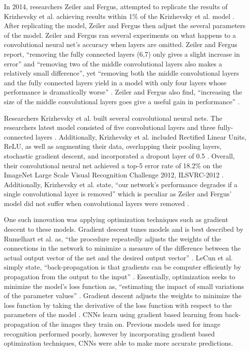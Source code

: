 \documentclass[12pt,english]{article}
\begin{document}
In 2014, researchers Zeiler and Fergus, attempted to replicate the results of Krizhevsky et al. achieving results within 1\% of the Krizhevsky et al. model \citep{DBLP:journals/corr/ZeilerF13}. After replicating the model, Zeiler and Fergus then adjust the several parameters of the model. Zeiler and Fergus ran several experiments on what happens to a convolutional neural net’s accuracy when layers are omitted. Zeiler and Fergus report, ``removing the fully connected layers (6,7) only gives a slight increase in error'' and ``removing two of the middle convolutional layers also makes a relatively small difference'', yet ``removing both the middle convolutional layers and the fully connected layers yield in a model with only four layers whose performance is dramatically worse'' \citep{DBLP:journals/corr/ZeilerF13}. Zeiler and Fergus also find, ``increasing the size of the middle convolutional layers goes give a useful gain in performance'' \citep{DBLP:journals/corr/ZeilerF13}.\par

Researchers Krizhevsky et al. built several convolutional neural nets. The researchers latest model consisted of five convolutional layers and three fully-connected layers \citep{NIPS2012_4824}. Additionally, Krizhevsky et al. included Rectified Linear Units, ReLU, as well as augmenting their data, overlapping their pooling layers, stochastic gradient descent, and incorporated a dropout layer of 0.5 \citep{NIPS2012_4824}. Overall, their convolutional neural net achieved a top-5 error rate of 18.2\% on the ImageNet Large Scale Visual Recognition Challenge 2012, ILSVRC-2012 \citep{NIPS2012_4824}. Additionally, Krizhevsky et al. state, ``our network’s performance degrades if a single convolutional layer is removed'' which is peculiar as Zeiler and Fergus’ model did not suffer when convolutional layers were removed \citep{NIPS2012_4824}.\par

One such innovation was applying optimization techniques such as gradient descent to these models. Gradient descent tunes models and is best described by Rumelhart et al. as, ``the procedure repeatedly adjusts the weights of the connections in the network to minimize a measure of the difference between the actual output vector of the net and the desired output vector'' \citep{Rumelhart:1988:LRB:65669.104451}. LeCun et al. simply state, ``back-propagation is that gradients can be computer efficiently by propagation from the output to the input'' \citep{lecun-98}. Essentially, optimization seeks to minimize the model’s loss function as, ``estimating the impact of small variations of the parameter values'' \citep{lecun-98}. Gradient descent adjusts the weights to minimize the loss function by taking the derivative of the loss function with respect to the parameters of the model \citep{lecun-98}. CNNs learn using gradient based learning from back-propagation of the images they train on. Previous models used for image recognition performed poorly, however by incorporating gradient based optimization techniques, CNNs were able to make more accurate predictions. \par
\end{document}
